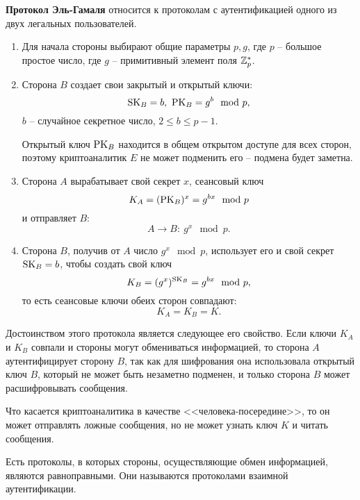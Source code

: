 \textbf{Протокол Эль-Гамаля} относится к протоколам с аутентификацией одного из двух легальных пользователей.
\begin{enumerate}
    \item Для начала стороны выбирают общие параметры $p, g$, где $p$ -- большое простое число, где $g$ -- примитивный элемент поля $\mathbb{Z}_p^*$.
    \item Сторона $B$ создает свои закрытый и открытый ключи:
            \[ \textrm{SK}_B = b, ~ \textrm{PK}_B = g^b \mod p, \]
        $b$ -- случайное секретное число, $2 \leq b \leq p-1$.

        Открытый ключ $\textrm{PK}_B$ находится в общем открытом доступе для всех сторон, поэтому криптоаналитик $E$ не может подменить его -- подмена будет заметна.
    \item Сторона $A$ вырабатывает свой секрет $x$, сеансовый ключ
            \[ K_A = (\textrm{PK}_B)^x = g^{bx} \mod p \]
        и отправляет $B$:
            \[ A \rightarrow B: ~ g^x \mod p. \]
    \item Сторона $B$, получив от $A$ число $g^x \mod p$, использует его и свой секрет $\textrm{SK}_B = b$, чтобы создать свой ключ
            \[ K_B = (g^x)^{\textrm{SK}_B} = g^{bx} \mod p, \]
        то есть сеансовые ключи обеих сторон совпадают:
            \[ K_A = K_B = K. \]
\end{enumerate}

Достоинством этого протокола является следующее его свойство. Если ключи $K_A$ и $K_B$ совпали и стороны могут обмениваться информацией, то сторона $A$ аутентифицирует сторону $B$, так как для шифрования она использовала открытый ключ $B$, который не может быть незаметно подменен, и только сторона $B$ может расшифровывать сообщения.

Что касается криптоаналитика в качестве <<человека-посередине>>, то он может отправлять ложные сообщения, но не может узнать ключ $K$ и читать сообщения.

Есть протоколы, в которых стороны, осуществляющие обмен информацией, являются равноправными. Они называются протоколами взаимной аутентификации.
